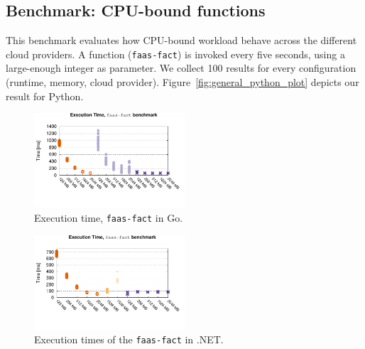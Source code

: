 \subsection{Benchmark: CPU-bound functions}
\label{sec:general_test}
This benchmark evaluates how CPU-bound workload behave across the different cloud providers.
A function (\texttt{faas-fact}) is invoked every five seconds, using a large-enough integer as parameter. 
We collect 100 results for every configuration (runtime, memory, cloud provider).
Figure~\ref{fig:general_python_plot} depicts our result for Python.


\begin{figure}[!t]
\centering
\includegraphics[width=0.5\textwidth, trim={0 40 0 0}]{bilder/general_go/cpufact.pdf}
\caption{Execution time, \texttt{faas-fact} in Go.}
\label{fig:general_go_plot}
\end{figure}

\begin{figure}[!t]
\centering
\includegraphics[width=0.5\textwidth, trim={0 40 0 0}]{bilder/general_dotnet/cpufact.pdf}
\caption{Execution times of the \texttt{faas-fact} in .NET.}
\label{fig:general_dotnet_plot}
\end{figure}

